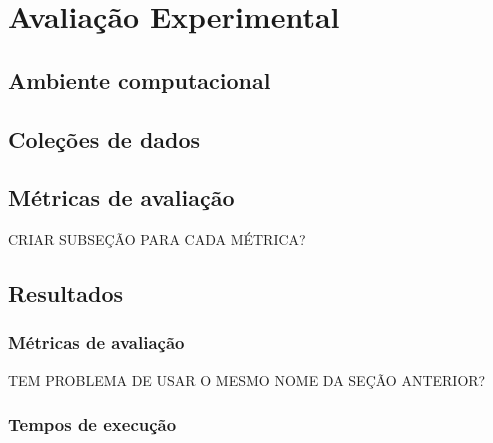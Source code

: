 \chapter{Avaliação Experimental}
\section{Ambiente computacional}



\section{Coleções de dados}



\section{Métricas de avaliação}
CRIAR SUBSEÇÃO PARA CADA MÉTRICA?

\section{Resultados}

\subsection{Métricas de avaliação}
TEM PROBLEMA DE USAR O MESMO NOME DA SEÇÃO ANTERIOR?

\subsection{Tempos de execução}


